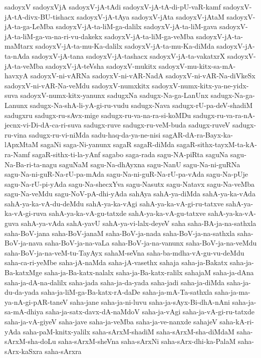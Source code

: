 {sadoyxV
sadoyxVjA
sadoyxV-jA-tAdi
sadoyxV-jA-tA-di-pU-vaR-kamf
sadoyxV-jA-tA-divx-BU-tishacx
sadoyxV-jA-tAya
sadoyxV-jAta
sadoyxV-jAtaM
sadoyxV-jA-ta-ga-LeMba
sadoyxV-jA-ta-liM-ga-dalilx
sadoyxV-jA-ta-liM-gava
sadoyxV-jA-ta-liM-ga-va-na-ri-vu-dakekx
sadoyxV-jA-ta-liM-ga-veMba
sadoyxV-jA-ta-maMtarx
sadoyxV-jA-ta-mu-Ka-dalilx
sadoyxV-jA-ta-mu-Ka-diMda
sadoyxV-jA-ta-nAda
sadoyxV-jA-tana
sadoyxV-jA-tashacx
sadoyxV-jA-ta-vakatxrX
sadoyxV-jA-ta-veMba
sadoyxV-jA-teVsha
sadoyxV-mukitx
sadoyxV-mu-kitx-sa-mA-havxyA
sadoyxV-ni-vARNa
sadoyxV-ni-vAR-NadA
sadoyxV-ni-vAR-Na-diVkeSx
sadoyxV-ni-vAR-Na-veMdu
sadoyxV-numxkitx
sadoyxV-numx-kitx-ya-ne-yidx-suva
sadoyxV-numx-kitx-yanunx
sadugxNa
sadugx-Na-ga-LanUnx
sadugx-Na-ga-Lanunx
sadugx-Na-shA-li-yA-gi-ru-vudu
sadugx-Nava
sadugx-rU-pa-deV-shadiM
sadugxru
sadugx-ru-sAvx-mige
sadugx-ru-va-na-ra-si-koMDu
sadugx-ru-va-ra-nA-jecnx-vi-Di-dA-ca-ri-suva
sadugx-ruve
sadugx-ru-veM-buda
sadugx-ruveV
sadugx-ru-vina
sadugx-ru-vi-niMda
sadu-haq-da-ya-ne-nisi
sagAR-dA-ra-Bayx-ka-lApxMtaM
sagaNi
saga-Ni-yanunx
sagaR
sagaR-diMda
sagaR-sithx-tayxM-ta-kA-ra-Namf
sagaR-sithx-ti-la-yAnf
sagabo
saga-rada
sagu-NA-piRta
saguNa
sagu-Na-Ba-ri-ta-nagu
saguNaM
sagu-Na-dhAyxna
sagu-NanU
sagu-Na-ni-guRNa
sagu-Na-ni-guR-Na-rU-pa-mAda
sagu-Na-ni-guR-Na-rU-pa-vAda
sagu-Na-pUje
sagu-Na-rU-pi-yAda
sagu-Na-shecxYva
sagu-Nasutx
sagu-Natavx
sagu-Na-veMba
sagu-Na-veMdu
sagu-NoV-pA-dhi-yAda
sahAya
sahA-ya-diMda
sahA-ya-ka-vAda
sahA-ya-ka-vA-du-deMdu
sahA-ya-ka-vAgi
sahA-ya-ka-vA-gi-ru-tatxve
sahA-ya-ka-vA-gi-ruva
sahA-ya-ka-vA-gu-tatxde
sahA-ya-ka-vA-gu-tatxve
sahA-ya-ka-vA-guva
sahA-ya-vAda
sahA-yavU
sahA-ya-vi-lalx-deyeV
saha
saha-BA-ja-na-sathxla
saha-BoV-jana
saha-BoV-janaM
saha-BoV-ja-nada
saha-BoV-ja-na-sathxla
saha-BoV-ja-nava
saha-BoV-ja-na-vaLa
saha-BoV-ja-na-vanunx
saha-BoV-ja-na-veMdu
saha-BoV-ja-na-veM-tu-TayAyx
sahaM-seVna
saha-ba-mdha-vA-gu-vu-deMdu
saha-ca-ri-yeMbe
saha-jA-naMda
saha-jA-vasethx
sahaja
saha-ja-Bakatx
saha-ja-Ba-katxMge
saha-ja-Ba-katx-nalalx
saha-ja-Ba-katx-ralilx
sahajaM
saha-ja-dAna
saha-ja-dA-na-dalilx
saha-jada
saha-ja-da-yada
saha-jadi
saha-ja-diMda
saha-ja-du-da-yada
saha-ja-liM-ga-Ba-katx-rA-daDe
saha-ja-mA-Ta-sathxla
saha-ja-ma-ya-nA-gi-pAR-taneV
saha-jane
saha-ja-ni-luvu
saha-ja-sAyx-Bi-dhA-nAni
saha-ja-sa-mA-dhiya
saha-ja-satx-davx-dA-naMdoV
saha-ja-vAgi
saha-ja-vA-gi-ru-tatxde
saha-ja-vA-giyeV
saha-jave
saha-ja-veMba
saha-ja-ve-nanxde
sahajeV
saha-kA-ri-yAda
saha-paM-knitx-yalilx
saha-sArxM-shadiM
saha-sArxM-sha-diMdaM
saha-sArxM-sha-doLu
saha-sArxM-sheVna
saha-sArxNi
saha-sArx-dhi-ka-PalaM
saha-sArx-kaSxra
saha-sArxra
}
